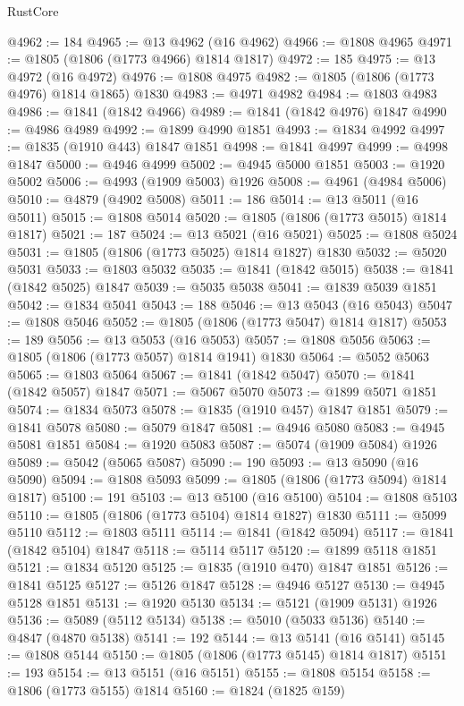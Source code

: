 \begin{lexlean}{RustCore}
\begin{coremodule}
@4962 := 184
@4965 := @13 @4962 (@16 @4962)
@4966 := @1808 @4965
@4971 := @1805 (@1806 (@1773 @4966) @1814 @1817)
@4972 := 185
@4975 := @13 @4972 (@16 @4972)
@4976 := @1808 @4975
@4982 := @1805 (@1806 (@1773 @4976) @1814 @1865) @1830
@4983 := @4971 @4982
@4984 := @1803 @4983
@4986 := @1841 (@1842 @4966)
@4989 := @1841 (@1842 @4976) @1847
@4990 := @4986 @4989
@4992 := @1899 @4990 @1851
@4993 := @1834 @4992
@4997 := @1835 (@1910 @443) @1847 @1851
@4998 := @1841 @4997
@4999 := @4998 @1847
@5000 := @4946 @4999
@5002 := @4945 @5000 @1851
@5003 := @1920 @5002
@5006 := @4993 (@1909 @5003) @1926
@5008 := @4961 (@4984 @5006)
@5010 := @4879 (@4902 @5008)
@5011 := 186
@5014 := @13 @5011 (@16 @5011)
@5015 := @1808 @5014
@5020 := @1805 (@1806 (@1773 @5015) @1814 @1817)
@5021 := 187
@5024 := @13 @5021 (@16 @5021)
@5025 := @1808 @5024
@5031 := @1805 (@1806 (@1773 @5025) @1814 @1827) @1830
@5032 := @5020 @5031
@5033 := @1803 @5032
@5035 := @1841 (@1842 @5015)
@5038 := @1841 (@1842 @5025) @1847
@5039 := @5035 @5038
@5041 := @1839 @5039 @1851
@5042 := @1834 @5041
@5043 := 188
@5046 := @13 @5043 (@16 @5043)
@5047 := @1808 @5046
@5052 := @1805 (@1806 (@1773 @5047) @1814 @1817)
@5053 := 189
@5056 := @13 @5053 (@16 @5053)
@5057 := @1808 @5056
@5063 := @1805 (@1806 (@1773 @5057) @1814 @1941) @1830
@5064 := @5052 @5063
@5065 := @1803 @5064
@5067 := @1841 (@1842 @5047)
@5070 := @1841 (@1842 @5057) @1847
@5071 := @5067 @5070
@5073 := @1899 @5071 @1851
@5074 := @1834 @5073
@5078 := @1835 (@1910 @457) @1847 @1851
@5079 := @1841 @5078
@5080 := @5079 @1847
@5081 := @4946 @5080
@5083 := @4945 @5081 @1851
@5084 := @1920 @5083
@5087 := @5074 (@1909 @5084) @1926
@5089 := @5042 (@5065 @5087)
@5090 := 190
@5093 := @13 @5090 (@16 @5090)
@5094 := @1808 @5093
@5099 := @1805 (@1806 (@1773 @5094) @1814 @1817)
@5100 := 191
@5103 := @13 @5100 (@16 @5100)
@5104 := @1808 @5103
@5110 := @1805 (@1806 (@1773 @5104) @1814 @1827) @1830
@5111 := @5099 @5110
@5112 := @1803 @5111
@5114 := @1841 (@1842 @5094)
@5117 := @1841 (@1842 @5104) @1847
@5118 := @5114 @5117
@5120 := @1899 @5118 @1851
@5121 := @1834 @5120
@5125 := @1835 (@1910 @470) @1847 @1851
@5126 := @1841 @5125
@5127 := @5126 @1847
@5128 := @4946 @5127
@5130 := @4945 @5128 @1851
@5131 := @1920 @5130
@5134 := @5121 (@1909 @5131) @1926
@5136 := @5089 (@5112 @5134)
@5138 := @5010 (@5033 @5136)
@5140 := @4847 (@4870 @5138)
@5141 := 192
@5144 := @13 @5141 (@16 @5141)
@5145 := @1808 @5144
@5150 := @1805 (@1806 (@1773 @5145) @1814 @1817)
@5151 := 193
@5154 := @13 @5151 (@16 @5151)
@5155 := @1808 @5154
@5158 := @1806 (@1773 @5155) @1814
@5160 := @1824 (@1825 @159)

\end{coremodule}
\end{lexlean}
